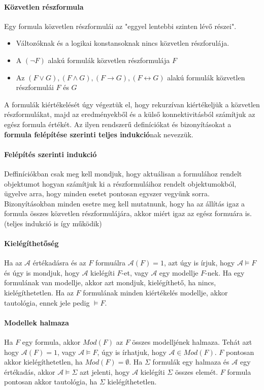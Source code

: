 \documentclass[10pt,a4paper]{article}
\begin{document}
\paragraph{Közvetlen részformula}
Egy formula közvetlen részformulái az "eggyel lentebbi szinten lévő részei". 
\begin{itemize}
\item Változóknak és a logikai konstansoknak nincs közvetlen részforulája.
\item A $(\neg F)$ alakú formulák közvetlen részformulája $F$
\item Az $(F \vee G), (F \wedge G), (F \rightarrow G), (F \leftrightarrow G)$ alakú formulák közvetlen részformulái  $F$ és $G$
\end{itemize}
A formulák kiértékelését úgy végeztük el, hogy rekurzívan kiértékeljük a közvetlen részformulákat, majd az eredményekből és a külső konnektivitásból számítjuk az egész formula értékét. Az ilyen rendszerű definíciókat és bizonyításokat a \textbf{formula felépítése szerinti teljes indukció}nak nevezzük.
\paragraph{Felépítés szerinti indukció}
Deffiníciókban csak meg kell mondjuk, hogy aktuálisan a formulához rendelt objektumot hogyan számítjuk ki a részformuláihoz rendelt objektumokból, ügyelve arra, hogy minden esetet pontosan egyszer vegyünk sorra. \newline
Bizonyításokban minden esetre meg kell mutatnunk, hogy ha az állítás igaz a formula összes közvetlen részformulájára, akkor miért igaz az egész formuára is. (teljes indukció is így működik)
\paragraph{Kielégíthetőség}
Ha az $\mathcal{A}$ értékadásra és az $F$ formuálra $\mathcal{A}(F)=1$, azt úgy is írjuk, hogy $\mathcal{A}\models F$ és úgy is mondjuk, hogy $\mathcal{A}$ kielégíti $F$-et, vagy $\mathcal{A}$ egy modellje $F$-nek. Ha egy formulának van modellje, akkor azt mondjuk, kielégíthető, ha nincs, kielégíthetetlen. Ha az $F$ formulának minden kiértékelés modellje, akkor tautológia, ennek jele pedig $\models F$.
\paragraph{Modellek halmaza}
Ha $F$ egy formula, akkor $Mod(F)$ az $F$ összes modelljének halmaza. Tehát azt hogy $\mathcal{A}(F)=1$, vagy $\mathcal{A} \models F$, úgy is írhatjuk, hogy $\mathcal{A}\in Mod(F)$. $F$ pontosan akkor kielégíthetetlen, ha $Mod(F)=\emptyset$. Ha $\Sigma$ formulák egy halmaza és $\mathcal{A}$ egy értékadás, akkor $\mathcal{A} \models \Sigma$ azt jelenti, hogy $\mathcal{A}$ kielégíti $\Sigma$ összes elemét. $F$ formula pontosan akkor tautológia, ha $\Sigma$ kielégíthetetlen.
\end{document}
